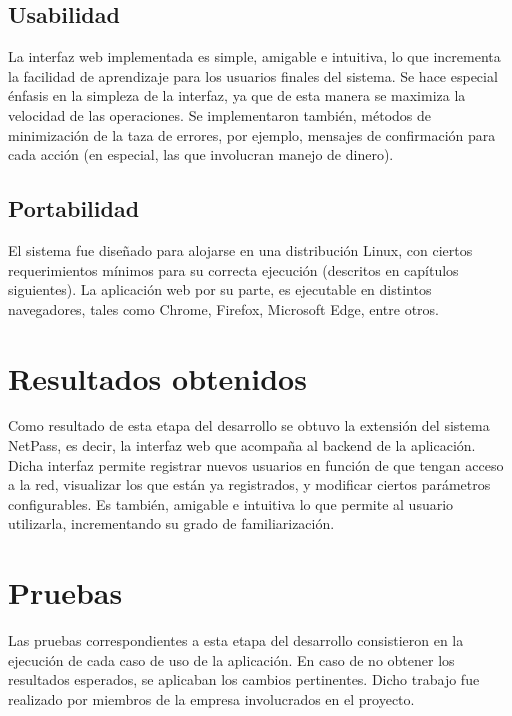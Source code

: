 \subsection{Usabilidad}
		La interfaz web implementada es simple, amigable e intuitiva, lo que incrementa la facilidad de aprendizaje para los usuarios finales del sistema. Se hace especial énfasis en la simpleza de la interfaz, ya que de esta manera se maximiza la velocidad de las operaciones. Se implementaron también, métodos de minimización de la taza de errores, por ejemplo, mensajes de confirmación para cada acción (en especial, las que involucran manejo de dinero). 

\subsection{Portabilidad}
		El sistema fue diseñado para alojarse en una distribución Linux, con ciertos requerimientos mínimos para su correcta ejecución (descritos en capítulos siguientes). La aplicación web por su parte, es ejecutable en distintos navegadores, tales como Chrome, Firefox, Microsoft Edge, entre otros.

\section{Resultados obtenidos} \label{sect:Resultados obtenidos}
		Como resultado de esta etapa del desarrollo se obtuvo la extensión del sistema NetPass, es decir, la interfaz web que acompaña al backend de la aplicación. Dicha interfaz permite registrar nuevos usuarios en función de que tengan acceso a la red, visualizar los que están ya registrados, y modificar ciertos parámetros configurables. Es también, amigable e intuitiva lo que permite al usuario utilizarla, incrementando su grado de familiarización.
		
\section{Pruebas}
		Las pruebas correspondientes a esta etapa del desarrollo consistieron en la ejecución de cada caso de uso de la aplicación. En caso de no obtener los resultados esperados, se aplicaban los cambios pertinentes. Dicho trabajo fue realizado por miembros de la empresa involucrados en el proyecto.